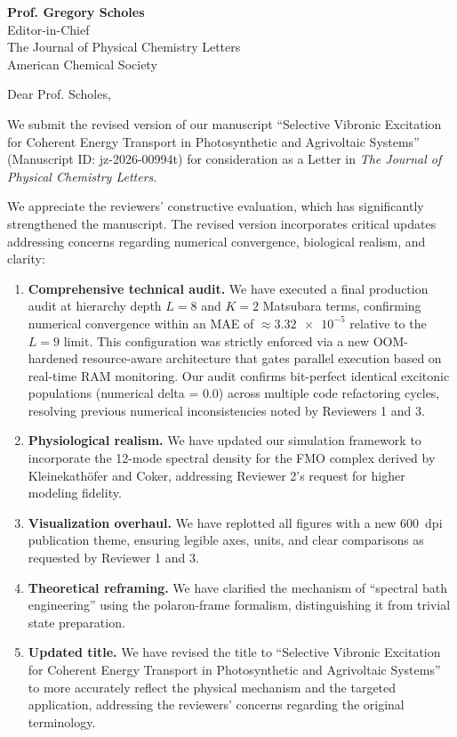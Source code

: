 \documentclass[11pt,a4paper]{letter}
\begin{document}
\begin{letter}{
\textbf{Prof. Gregory Scholes}\\
Editor-in-Chief\\
The Journal of Physical Chemistry Letters\\
American Chemical Society
}

\opening{Dear Prof. Scholes,}

We submit the revised version of our manuscript ``Selective Vibronic Excitation for Coherent Energy Transport in Photosynthetic and Agrivoltaic Systems'' (Manuscript ID: jz-2026-00994t) for consideration as a Letter in \textit{The Journal of Physical Chemistry Letters}.

We appreciate the reviewers' constructive evaluation, which has significantly strengthened the manuscript. The revised version incorporates critical updates addressing concerns regarding numerical convergence, biological realism, and clarity:

\begin{enumerate}
\item \textbf{Comprehensive technical audit.} We have executed a final production audit at hierarchy depth $L=8$ and $K=2$ Matsubara terms, confirming numerical convergence within an MAE of $\approx \num{3.32 e-5}$ relative to the $L=9$ limit. This configuration was strictly enforced via a new OOM-hardened resource-aware architecture that gates parallel execution based on real-time RAM monitoring. Our audit confirms bit-perfect identical excitonic populations (numerical delta = 0.0) across multiple code refactoring cycles, resolving previous numerical inconsistencies noted by Reviewers 1 and 3.
\item \textbf{Physiological realism.} We have updated our simulation framework to incorporate the 12-mode spectral density for the FMO complex derived by Kleinekathöfer and Coker, addressing Reviewer 2's request for higher modeling fidelity.
\item \textbf{Visualization overhaul.} We have replotted all figures with a new \SI{600}{dpi} publication theme, ensuring legible axes, units, and clear comparisons as requested by Reviewer 1 and 3.
\item \textbf{Theoretical reframing.} We have clarified the mechanism of ``spectral bath engineering'' using the polaron-frame formalism, distinguishing it from trivial state preparation.
\item \textbf{Updated title.} We have revised the title to ``Selective Vibronic Excitation for Coherent Energy Transport in Photosynthetic and Agrivoltaic Systems'' to more accurately reflect the physical mechanism and the targeted application, addressing the reviewers' concerns regarding the original terminology.
\end{enumerate}


\end{letter}
\end{document}
